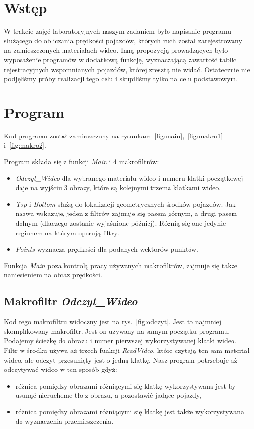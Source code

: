 \documentclass[11pt, a4paper]{article}
\begin{document}
\setcounter{page}{2}

\newpage

\section{Wstęp}

W trakcie zajęć laboratoryjnych naszym zadaniem było napisanie programu służącego do obliczania prędkości pojazdów, których ruch został zarejestrowany na zamieszczonych materiałach wideo. Inną propozycją prowadzących było wyposażenie programów w dodatkową funkcję, wyznaczającą zawartość tablic rejestracyjnych wspomnianych pojazdów, której zresztą nie widać. Ostatecznie nie podjęliśmy próby realizacji tego celu i skupiliśmy tylko na celu podstawowym.

\section{Program}

Kod programu został zamieszczony na rysunkach~\ref{fig:main},~\ref{fig:makro1} i~\ref{fig:makro2}.

Program składa się z funkcji \emph{Main} i 4 makrofiltrów:
\begin{itemize}
\item \emph{Odczyt\_Wideo} dla wybranego materiału wideo i numeru klatki początkowej daje na
wyjściu 3 obrazy, które są kolejnymi trzema klatkami wideo.
\item \emph{Top} i \emph{Bottom} służą do lokalizacji geometrycznych środków pojazdów. Jak nazwa wskazuje, jeden z filtrów zajmuje się pasem górnym, a drugi pasem dolnym (dlaczego zostanie wyjaśnione później). Różnią się one jedynie regionem na którym operują filtry.
\item \emph{Points} wyznacza prędkości dla podanych wektorów punktów.
\end{itemize}
Funkcja \emph{Main} poza kontrolą pracy używanych makrofiltrów, zajmuje się także naniesieniem na obraz prędkości.

\subsection*{Makrofiltr \emph{Odczyt\_Wideo}}

Kod tego makrofiltru widoczny jest na rys.~\ref{fig:odczyt}. Jest to najmniej skomplikowany makrofiltr. Jest on używany na samym początku programu. Podajemy ścieżkę do obrazu i numer pierwszej wykorzystywanej klatki wideo. Filtr w środku używa aż trzech funkcji \emph{ReadVideo}, które czytają ten sam materiał wideo, ale odczyt przesunięty jest o jedną klatkę. Nasz program potrzebuje aż odczytywać wideo w ten sposób gdyż:
\begin{itemize}
\item różnica pomiędzy obrazami różniącymi się klatkę wykorzystywana jest by usunąć nieruchome tło z obrazu, a pozostawić jadące pojazdy,
\item różnica pomiędzy obrazami różniącymi się klatkę jest także wykorzystywana do wyznaczenia przemieszczenia.
\end{itemize}
\end{document}
